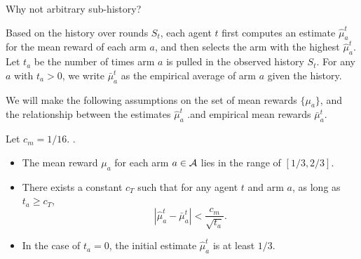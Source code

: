 \iffalse
\begin{itemize}
\item \textbf{Full history:} We show each agent the history of all previous agents' pulls. We call this policy \ALGG. 
\item \textbf{Unbiased sub-history:} We show each agent only a subset of history. The subsets are pre-determined before any arms are pulled.  
\item \textbf{Info graph:} All the recommendation policies in this paper can be described by an undirected transitive graph with $T$ nodes. We call it the info graph. The $T$ nodes in the graph represent the $T$ agents. If there is an edge between node $u$ and $v$ for $u < v$, it means the history of agent $u$ is shown to agent $v$.
\end{itemize}
\fi

\begin{remark}
  Why not arbitrary sub-history? 
\end{remark}

 Based on the history over rounds $S_t$, each
agent $t$ first computes an estimate $\hat{\mu}_a^t$ for the mean
reward of each arm $a$, and then selects the arm with the highest
$\hat{\mu}_a^t$. Let $t_a$ be the number of times arm $a$ is pulled in
the observed history $S_t$. For any $a$ with $t_a > 0$, we write
$\bar{\mu}_a^t$ as the empirical average of arm $a$ given the history.


We will make the following assumptions on the set of mean rewards
$\{\mu_a\}$, and the relationship between the estimates $\hat \mu_a^t$
.and empirical mean rewards $\bar\mu_a^t$.



\begin{assumption}
\label{ass:embehave}
Let $c_m = 1/16$. . 
\begin{itemize}
\item The mean reward $\mu_a$ for each arm $a\in \mathcal{A}$ lies in the range
  of $[1/3, 2/3]$.


\item There exists a constant $c_T$ such that for any agent $t$ and
  arm $a$, as long as $t_a \geq c_T$,
\[
  \left|\hat{\mu}^t_a - \bar{\mu}^t_a \right| <
  \frac{c_m}{\sqrt{t_a}}.
\]
\item In the case of $t_a = 0$, the initial estimate $\hat{\mu}^t_a$
  is at least $1/3$.
\end{itemize}
\end{assumption}


